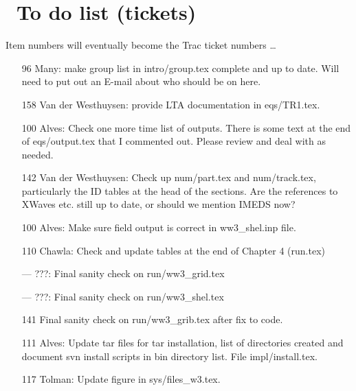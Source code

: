 \pagestyle{myheadings} \setcounter{page}{1} \setcounter{footnote}{0}

\section{~To do list (tickets)} \label{app:to_do}
\newcounters 
\vssub

\noindent
Item numbers will eventually become the Trac ticket numbers \ldots

\begin{itemize}

\item[96] Many: make group list in intro/group.tex complete and up to
  date. Will need to put out an E-mail about who should be on here.

\item[158] Van der Westhuysen: provide LTA documentation in eqs/TR1.tex.

\item[100] Alves: Check one more time list of outputs. There is some text at
  the end of eqs/output.tex that I commented out. Please review and deal with
  as needed.

\item[142] Van der Westhuysen: Check up num/part.tex and num/track.tex,
  particularly the ID tables at the head of the sections. Are the references to
  XWaves etc. still up to date, or should we mention IMEDS now?

\item[100] Alves: Make sure field output is correct in ww3\_shel.inp file.

\item[110] Chawla: Check and update tables at the end of Chapter 4 (run.tex)

\item[---] ???: Final sanity check on run/ww3\_grid.tex

\item[---] ???: Final sanity check on run/ww3\_shel.tex

\item[141] Final sanity check on run/ww3\_grib.tex after fix to code.

\item[111] Alves: Update tar files for tar installation, list of directories
  created and document svn install scripts in bin directory list. File
  impl/install.tex. 

\item[117] Tolman: Update figure in sys/files\_w3.tex.


\end{itemize}
